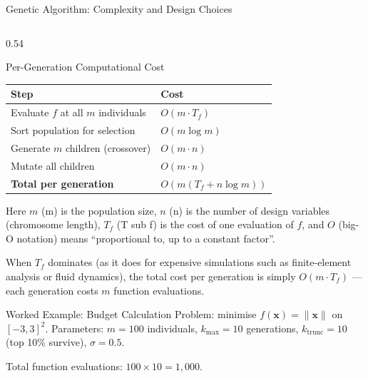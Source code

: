 \documentclass[aspectratio=169,10pt]{beamer}
\newcommand{\bx}{\mathbf{x}}
\begin{document}
\begin{frame}[allowframebreaks]{Genetic Algorithm: Complexity and Design Choices}

  \begin{columns}[T]
    \begin{column}{0.54\textwidth}
      \begin{block}{Per-Generation Computational Cost}
        \begin{tabular}{ll}
          \toprule
          Step & Cost \\
          \midrule
          Evaluate $f$ at all $m$ individuals & $O(m \cdot T_f)$ \\
          Sort population for selection & $O(m \log m)$ \\
          Generate $m$ children (crossover) & $O(m \cdot n)$ \\
          Mutate all children & $O(m \cdot n)$ \\
          \midrule
          \textbf{Total per generation} & $O(m(T_f + n\log m))$ \\
          \bottomrule
        \end{tabular}

        \vspace{4pt}
        Here $m$ (m) is the population size, $n$ (n) is the number
        of design variables (chromosome length), $T_f$ (T sub f) is
        the cost of one evaluation of $f$, and $O$ (big-O notation)
        means ``proportional to, up to a constant factor''.

        When $T_f$ dominates (as it does for expensive simulations
        such as finite-element analysis or fluid dynamics), the total
        cost per generation is simply $O(m \cdot T_f)$ --- each
        generation costs $m$ function evaluations.
      \end{block}

      \vspace{4pt}
      \begin{exampleblock}{Worked Example: Budget Calculation}
        Problem: minimise $f(\bx) = \|\bx\|$ on $[-3,3]^2$.
        Parameters: $m = 100$ individuals, $k_{\max} = 10$ generations,
        $k_{\text{trunc}} = 10$ (top 10\% survive), $\sigma = 0.5$.

        Total function evaluations: $100 \times 10 = 1{,}000$.


\end{exampleblock}
\end{column}
\end{columns}
\end{frame}
\end{document}
